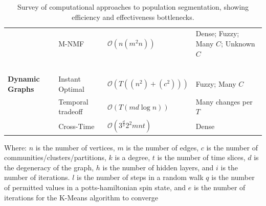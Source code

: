 \begin{landscape}
\begin{table}[t]
{\begin{tabular}{l|lll}
                                                    & M-NMF~\cite{Wang2017}                             & $\mathcal{O}(n(m^2n))$                    & Dense; Fuzzy; Many $C$; Unknown $C$ \\
                        ~                           &                         ~                         & ~                                         & ~ \\      
        \textbf{Dynamic Graphs}                     & Instant Optimal~\cite{Rossetti2018,Ilhan2015}     &  $\mathcal{O}(T((n^2)+(c^{2})))$          & Fuzzy; Many $C$ \\ %
                        ~                           & Temporal tradeoff~\cite{Rossetti2018,Bansal2011}  &  $\mathcal{O}(T(md\log{n}))$              & Many changes per $T$ \\ %
                        ~                           & Cross-Time~\cite{Rossetti2018,Himmel2016}         &  $\mathcal{O}(3^{\frac{d}{3}}2^{2}mnt)$   & Dense \\ %
        \end{tabular} 
        \caption{Survey of computational approaches to population segmentation, showing efficiency and effectiveness bottlenecks.}
        \label{Table:cd-survey}
        }
      \end{table}
      \noindent
      {\footnotesize
      Where:
      \textbf{$n$} is the number of vertices, 
      \textbf{$m$} is the number of edges,
      \textbf{$c$} is the number of communities/clusters/partitions, 
      \textbf{$k$} is a degree,
      \textbf{$t$} is the number of time slices,
      \textbf{$d$} is the degeneracy of the graph,
      \textbf{$h$} is the number of hidden layers, and
      \textbf{$i$} is the number of iterations.
      \textbf{$l$} is the number of steps in a random walk
      \textbf{$q$} is the number of permitted values in a potts-hamiltonian spin state, and 
      \textbf{$e$} is the number of iterations for the K-Means algorithm to converge
}
    \end{landscape}
